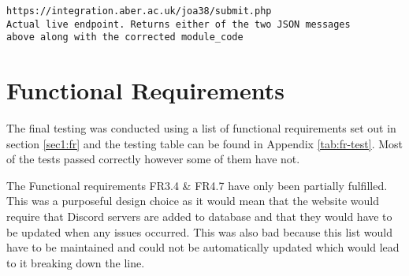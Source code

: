 \begin{verbatim}
https://integration.aber.ac.uk/joa38/submit.php
Actual live endpoint. Returns either of the two JSON messages 
above along with the corrected module_code
\end{verbatim}

\section{Functional Requirements}\label{sec4:fr}
The final testing was conducted using a list of functional requirements set out in section \ref{sec1:fr} and the testing table can be found in Appendix \ref{tab:fr-test}. Most of the tests passed correctly however some of them have not.

The Functional requirements FR3.4 \& FR4.7 have only been partially fulfilled. This was a purposeful design choice as it would mean that the website would require that Discord servers are added to database and that they would have to be updated when any issues occurred. This was also bad because this list would have to be maintained and could not be automatically updated which would lead to it breaking down the line.